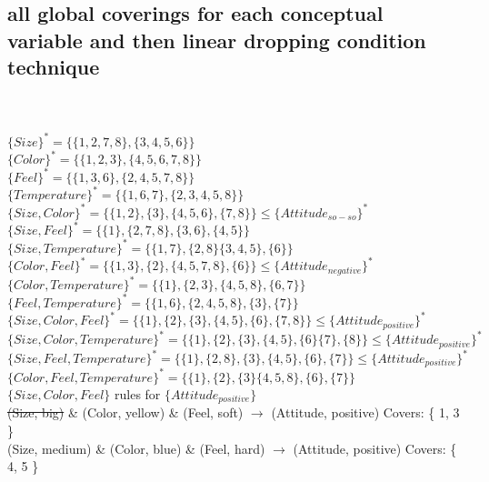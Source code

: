 \documentclass[10pt]{amsart}
\begin{document}
\subsection{all global coverings for each conceptual variable and then linear dropping condition technique}\hspace*{\fill} \\
\\
$\{ Size \}^* = \{ \{ 1, 2, 7, 8 \}, \{ 3, 4, 5, 6 \} \}$\\
$\{ Color \}^* = \{ \{ 1, 2, 3 \}, \{ 4, 5, 6, 7, 8 \} \}$\\
$\{ Feel \}^* = \{ \{ 1, 3, 6 \}, \{ 2, 4, 5, 7, 8 \} \}$\\
$\{ Temperature \}^* = \{ \{ 1, 6, 7 \}, \{ 2, 3, 4, 5, 8 \} \}$\\

$\{ Size, Color \}^* = \{ \{ 1, 2 \}, \{ 3 \}, \{ 4, 5, 6 \}, \{ 7, 8 \} \} \leq \{ Attitude_{so-so} \}^* $\\
$\{ Size, Feel \}^* = \{ \{ 1 \}, \{ 2, 7, 8 \}, \{ 3, 6 \}, \{ 4, 5 \} \}$\\
$\{ Size, Temperature \}^* = \{ \{ 1, 7 \}, \{ 2, 8 \} \{ 3, 4, 5 \}, \{ 6 \} \}$\\
$\{ Color, Feel \}^* = \{ \{ 1, 3 \}, \{ 2 \}, \{ 4, 5, 7, 8 \}, \{ 6 \} \} \leq \{ Attitude_{negative} \}^*$\\
$\{ Color, Temperature \}^* = \{ \{ 1 \}, \{ 2, 3 \}, \{ 4, 5, 8 \}, \{ 6, 7 \} \}$\\
$\{ Feel, Temperature \}^* = \{ \{ 1, 6 \}, \{ 2, 4, 5, 8 \}, \{ 3 \}, \{ 7 \} \}$\\

$\{ Size, Color, Feel \}^* = \{ \{ 1 \}, \{ 2 \}, \{ 3 \}, \{ 4, 5 \}, \{ 6 \}, \{ 7, 8 \} \} \leq \{ Attitude_{positive} \}^*$\\
$\{ Size, Color, Temperature \}^* = \{ \{ 1 \}, \{ 2 \}, \{ 3 \}, \{ 4, 5 \}, \{ 6 \} \{ 7 \}, \{ 8 \} \} \leq \{ Attitude_{positive} \}^*$\\
$\{ Size, Feel, Temperature \}^* = \{ \{ 1 \}, \{ 2, 8 \}, \{ 3 \}, \{ 4, 5 \}, \{ 6 \}, \{ 7 \} \} \leq \{ Attitude_{positive} \}^*$\\
$\{ Color, Feel, Temperature \}^* = \{ \{ 1 \}, \{ 2 \}, \{ 3 \} \{ 4, 5, 8 \}, \{ 6 \}, \{ 7 \} \} $\\

$ \{ Size, Color, Feel \} $ rules for $ \{ Attitude_{positive} \} $\\
\sout{(Size, big)} \& (Color, yellow) \& (Feel, soft) $\rightarrow$ (Attitude, positive) \qquad Covers: \{ 1, 3 \} \\
(Size, medium) \& (Color, blue) \& (Feel, hard) $\rightarrow$ (Attitude, positive) \qquad Covers: \{ 4, 5 \} \\
\end{document}
